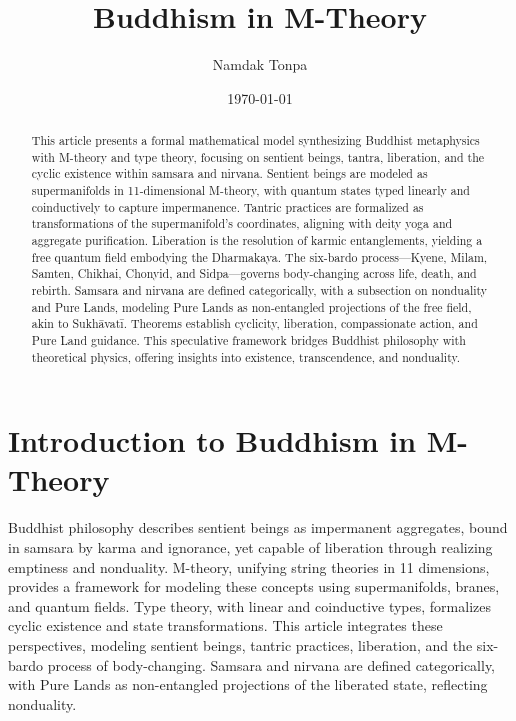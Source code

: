 \documentclass{article}
\begin{document}
\title{Buddhism in M-Theory}
\author{Namdak Tonpa}
\date{\today}

\maketitle

\begin{abstract}
This article presents a formal mathematical model synthesizing Buddhist metaphysics with M-theory and type theory, focusing on sentient beings, tantra, liberation, and the cyclic existence within samsara and nirvana. Sentient beings are modeled as supermanifolds in 11-dimensional M-theory, with quantum states typed linearly and coinductively to capture impermanence. Tantric practices are formalized as transformations of the supermanifold’s coordinates, aligning with deity yoga and aggregate purification. Liberation is the resolution of karmic entanglements, yielding a free quantum field embodying the Dharmakaya. The six-bardo process—Kyene, Milam, Samten, Chikhai, Chonyid, and Sidpa—governs body-changing across life, death, and rebirth. Samsara and nirvana are defined categorically, with a subsection on nonduality and Pure Lands, modeling Pure Lands as non-entangled projections of the free field, akin to Sukhāvatī. Theorems establish cyclicity, liberation, compassionate action, and Pure Land guidance. This speculative framework bridges Buddhist philosophy with theoretical physics, offering insights into existence, transcendence, and nonduality.
\end{abstract}

\tableofcontents

\newpage
\section{Introduction to Buddhism in M-Theory}
\label{sec:intro}
Buddhist philosophy describes sentient beings as impermanent aggregates, bound in samsara by karma and ignorance, yet capable of liberation through realizing emptiness and nonduality. M-theory, unifying string theories in 11 dimensions, provides a framework for modeling these concepts using supermanifolds, branes, and quantum fields. Type theory, with linear and coinductive types, formalizes cyclic existence and state transformations. This article integrates these perspectives, modeling sentient beings, tantric practices, liberation, and the six-bardo process of body-changing. Samsara and nirvana are defined categorically, with Pure Lands as non-entangled projections of the liberated state, reflecting nonduality.
\end{document}
